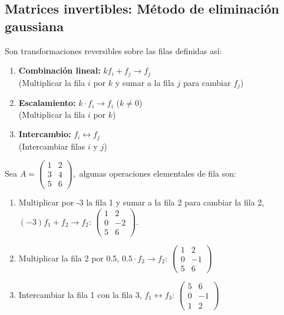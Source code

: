 \subsection{Matrices invertibles: Método de eliminación gaussiana}

\begin{definition}
Son transformaciones reversibles sobre las filas definidas así:
\begin{enumerate}
\item \textbf{Combinación lineal:} $k f_i + f_j \to f_j$ \\
  (Multiplicar la fila $i$ por $k$ y sumar a la fila $j$ para cambiar $f_j$)
  
\item \textbf{Escalamiento:} $k \cdot f_i \to f_i$ \quad ($k \neq 0$) \\
  (Multiplicar la fila $i$ por $k$)

\item \textbf{Intercambio:} $f_i \leftrightarrow f_j$ \\
  (Intercambiar filas $i$ y $j$)
\end{enumerate}
\end{definition}

\begin{example}
Sea $A = \begin{pmatrix} 1 & 2 \\ 3 & 4 \\ 5 & 6 \end{pmatrix},$ algunas operaciones elementales de fila son:
\begin{myproof}
\begin{enumerate}
\item Multiplicar por -3 la fila 1 y sumar a la fila 2 para cambiar la fila 2, $(-3)f_1 + f_2 \to f_2$: 
  $\begin{pmatrix} 1 & 2 \\ 0 & -2 \\ 5 & 6 \end{pmatrix}.$
\item Multiplicar la fila 2 por 0.5, $0.5 \cdot f_2 \to f_2$: 
  $\begin{pmatrix} 1 & 2 \\ 0 & -1 \\ 5 & 6 \end{pmatrix}$
\item Intercambiar la fila 1 con la fila 3, $f_1 \leftrightarrow f_3$: 
  $\begin{pmatrix} 5 & 6 \\ 0 & -1 \\ 1 & 2 \end{pmatrix}$
\end{enumerate}
\end{myproof}
\end{example}


